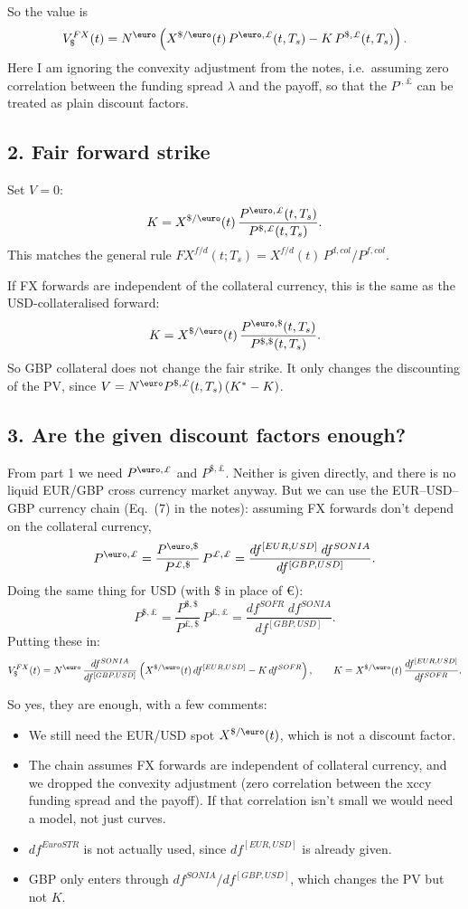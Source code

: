 \documentclass[11pt]{article}
\begin{document}
So the value is
\[
V_{\$}^{FX}(t) = N^{\text{\euro}} \left( X^{\$/\text{\euro}}(t)\, P^{\text{\euro},\pounds}(t,T_s) - K\, P^{\$,\pounds}(t,T_s) \right).
\]
Here I am ignoring the convexity adjustment from the notes, i.e.\ assuming zero correlation
between the funding spread $\lambda$ and the payoff, so that the $P^{\cdot,\pounds}$ can be
treated as plain discount factors.

\subsection*{2. Fair forward strike}

Set $V = 0$:
\[
K = X^{\$/\text{\euro}}(t)\, \frac{P^{\text{\euro},\pounds}(t,T_s)}{P^{\$,\pounds}(t,T_s)}.
\]
This matches the general rule $FX^{f/d}(t;T_s) = X^{f/d}(t)\, P^{d,col}/P^{f,col}$.

If FX forwards are independent of the collateral currency, this is the same as the
USD-collateralised forward:
\[
K = X^{\$/\text{\euro}}(t)\, \frac{P^{\text{\euro},\$}(t,T_s)}{P^{\$,\$}(t,T_s)}.
\]
So GBP collateral does not change the fair strike. It only changes the discounting of the PV,
since $V = N^{\text{\euro}} P^{\$,\pounds}(t,T_s)\,(K^* - K)$.

\subsection*{3. Are the given discount factors enough?}

From part 1 we need $P^{\text{\euro},\pounds}$ and $P^{\$,\pounds}$. Neither is given directly,
and there is no liquid EUR/GBP cross currency market anyway. But we can use the
EUR--USD--GBP currency chain (Eq.\ (7) in the notes): assuming FX forwards don't depend on the
collateral currency,
\[
P^{\text{\euro},\pounds} = \frac{P^{\text{\euro},\$}}{P^{\pounds,\$}}\, P^{\pounds,\pounds}
= \frac{df^{[EUR,USD]}\; df^{SONIA}}{df^{[GBP,USD]}}.
\]
Doing the same thing for USD (with $\$$ in place of \euro):
\[
P^{\$,\pounds} = \frac{P^{\$,\$}}{P^{\pounds,\$}}\, P^{\pounds,\pounds}
= \frac{df^{SOFR}\; df^{SONIA}}{df^{[GBP,USD]}}.
\]
Putting these in:
\[
V_{\$}^{FX}(t) = N^{\text{\euro}}\, \frac{df^{SONIA}}{df^{[GBP,USD]}}
\left( X^{\$/\text{\euro}}(t)\, df^{[EUR,USD]} - K\, df^{SOFR} \right),
\qquad
K = X^{\$/\text{\euro}}(t)\, \frac{df^{[EUR,USD]}}{df^{SOFR}}.
\]

So yes, they are enough, with a few comments:
\begin{itemize}
  \item We still need the EUR/USD spot $X^{\$/\text{\euro}}(t)$, which is not a discount factor.
  \item The chain assumes FX forwards are independent of collateral currency, and we dropped the
        convexity adjustment (zero correlation between the xccy funding spread and the payoff).
        If that correlation isn't small we would need a model, not just curves.
  \item $df^{EuroSTR}$ is not actually used, since $df^{[EUR,USD]}$ is already given.
  \item GBP only enters through $df^{SONIA}/df^{[GBP,USD]}$, which changes the PV but not $K$.
\end{itemize}
\end{document}
